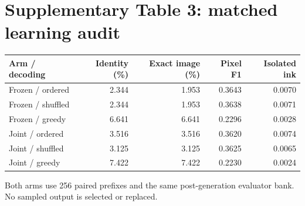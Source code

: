 \section*{Supplementary Table 3: matched learning audit}
\begin{center}\begin{tabular}{lrrrr}\toprule
Arm / decoding & Identity (\%) & Exact image (\%) & Pixel F1 & Isolated ink \\
\midrule
Frozen / ordered & 2.344 & 1.953 & 0.3643 & 0.0070 \\
Frozen / shuffled & 2.344 & 1.953 & 0.3638 & 0.0071 \\
Frozen / greedy & 6.641 & 6.641 & 0.2296 & 0.0028 \\
Joint / ordered & 3.516 & 3.516 & 0.3620 & 0.0074 \\
Joint / shuffled & 3.125 & 3.125 & 0.3625 & 0.0065 \\
Joint / greedy & 7.422 & 7.422 & 0.2230 & 0.0024 \\
\bottomrule\end{tabular}\end{center}
Both arms use 256 paired prefixes and the same post-generation evaluator bank. No sampled output is selected or replaced.
